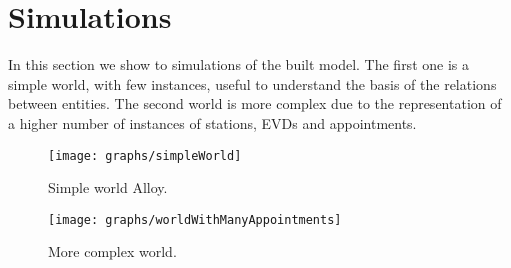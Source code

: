 \section{Simulations}
\label{sec: sim}%
In this section we show to simulations of the built model.
The first one is a simple world, with few instances, useful to understand the basis of the relations between entities.
The second world is more complex due to the representation of a higher number of instances of stations, EVDs and appointments.

\begin{sidewaysfigure}
	\begin{figure} [H]
		\begin{center}
			\texttt{[image: graphs/simpleWorld]}
			\caption{Simple world Alloy.}
			\label{fig: simple_world_alloy}
		\end{center}
	\end{figure}
\end{sidewaysfigure}

\begin{sidewaysfigure}
	\begin{figure} [H]
		\begin{center}
			\texttt{[image: graphs/worldWithManyAppointments]}
			\caption{More complex world.}
			\label{fig: many_appointments_world_alloy}
		\end{center}
	\end{figure}
\end{sidewaysfigure}
